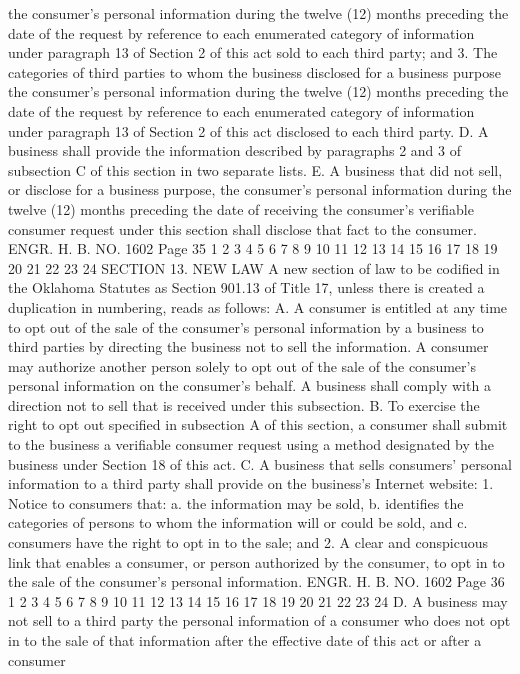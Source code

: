 the consumer's personal information during the twelve (12) months
preceding the date of the request by reference to each enumerated
category of information under paragraph 13 of Section 2 of this act
sold to each third party; and
3. The categories of third parties to whom the business
disclosed for a business purpose the consumer's personal information
during the twelve (12) months preceding the date of the request by
reference to each enumerated category of information under paragraph
13 of Section 2 of this act disclosed to each third party.
D. A business shall provide the information described by
paragraphs 2 and 3 of subsection C of this section in two separate
lists.
E. A business that did not sell, or disclose for a business
purpose, the consumer's personal information during the twelve (12)
months preceding the date of receiving the consumer's verifiable
consumer request under this section shall disclose that fact to the
consumer.
ENGR. H. B. NO. 1602 Page 35
1
2
3
4
5
6
7
8
9
10
11
12
13
14
15
16
17
18
19
20
21
22
23
24
SECTION 13. NEW LAW A new section of law to be codified
in the Oklahoma Statutes as Section 901.13 of Title 17, unless there
is created a duplication in numbering, reads as follows:
A. A consumer is entitled at any time to opt out of the sale of
the consumer's personal information by a business to third parties
by directing the business not to sell the information. A consumer
may authorize another person solely to opt out of the sale of the
consumer's personal information on the consumer's behalf. A
business shall comply with a direction not to sell that is received
under this subsection.
B. To exercise the right to opt out specified in subsection A
of this section, a consumer shall submit to the business a
verifiable consumer request using a method designated by the
business under Section 18 of this act.
C. A business that sells consumers' personal information to a
third party shall provide on the business's Internet website:
1. Notice to consumers that:
a. the information may be sold,
b. identifies the categories of persons to whom the
information will or could be sold, and
c. consumers have the right to opt in to the sale; and
2. A clear and conspicuous link that enables a consumer, or
person authorized by the consumer, to opt in to the sale of the
consumer's personal information.
ENGR. H. B. NO. 1602 Page 36
1
2
3
4
5
6
7
8
9
10
11
12
13
14
15
16
17
18
19
20
21
22
23
24
D. A business may not sell to a third party the personal
information of a consumer who does not opt in to the sale of that
information after the effective date of this act or after a consumer
